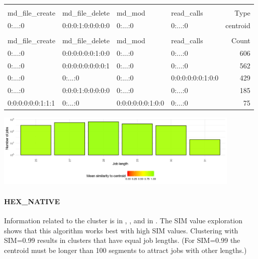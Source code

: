 \documentclass[]{llncs}
\begin{document}
  \begin{tiny}
    \begin{tabular}{@{ }l@{ }@{ }l@{ }@{ }l@{ }@{ }l@{ }|@{ }r@{ }}
      \rowcolor{tabhcolor}
      \multicolumn{4}{@{ }l|@{ }}{Hexadecimal coding} & \\
      \rowcolor{tabhcolor}
      md\_file\_create  & md\_file\_delete  & md\_mod           & read\_calls       & Type     \\ 
      \hline
      0:...:0           & 0:0:0:1:0:0:0:0:0 & 0:...:0           & 0:...:0           & centroid \\ 
      \multicolumn{5}{l}{}\\
      \rowcolor{tabhcolor}
      md\_file\_create  & md\_file\_delete  & md\_mod           & read\_calls       & Count    \\ 
      \hline
      0:...:0           & 0:0:0:0:0:0:1:0:0 & 0:...:0           & 0:...:0           & 606      \\ 
      0:...:0           & 0:0:0:0:0:0:0:0:1 & 0:...:0           & 0:...:0           & 562      \\ 
      0:...:0           & 0:...:0           & 0:...:0           & 0:0:0:0:0:0:1:0:0 & 429      \\ 
      0:...:0           & 0:0:0:1:0:0:0:0:0 & 0:...:0           & 0:...:0           & 185      \\ 
      0:0:0:0:0:0:1:1:1 & 0:...:0           & 0:0:0:0:0:0:1:0:0 & 0:...:0           & 75       \\ 
    \end{tabular}
  \end{tiny}
  \label{tab:hex_lev:top_jobs}
\endgroup
\begingroup
  \centering
  \includegraphics[width=4.61in,height=1.39in]{./media/image5.png}
  \label{fig:hex_lev:length}
\endgroup
\paragraph{HEX\_NATIVE}
Information related to the cluster is in , , and in .
The SIM value exploration shows that this algorithm works best with high SIM values.
Clustering with SIM=0.99 results in clusters that have equal job lengths.
(For SIM=0.99 the centroid must be longer than 100 segments to attract jobs with other lengths.) 
\end{document}
